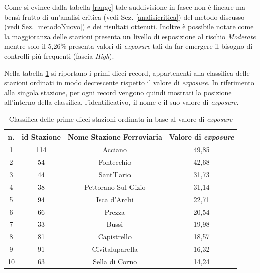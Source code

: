 Come si evince dalla tabella \ref{range} tale suddivisione in fasce non è lineare ma bensì frutto di un'analisi critica (vedi Sez.  \ref{analisicritica}) del metodo discusso (vedi Sez. \ref{metodoNuovo}) e dei risultati ottenuti. Inoltre è possibile notare come la maggioranza delle stazioni presenta un livello di esposizione al rischio \textit{Moderate} mentre solo il 5,26\% presenta valori di \textit{exposure} tali da far emergere il bisogno di controlli più frequenti (fascia \textit{High}).

Nella tabella \ref{classifica} si riportano i primi dieci record, appartenenti alla classifica delle stazioni ordinati in modo decrescente rispetto il valore di \textit{exposure}. In riferimento alla singola stazione, per ogni record vengono quindi mostrati la posizione all'interno della classifica, l'identificativo, il nome e il suo valore di \textit{exposure}.

\begin{table}[h]
\centering
\begin{tabular}{|c|c|c|c|}
\hline
\rowcolor{lightgray}
\textbf{n.} & \textbf{id Stazione} & \textbf{Nome Stazione Ferroviaria} & \textbf{Valore di \textit{exposure}} \\
\hline
\rowcolor{flamingopink}
1 & 114 & Acciano & 49,85 \\
\hline
\rowcolor{flamingopink}
2 & 54 & Fontecchio & 42,68 \\
\hline
\rowcolor{flamingopink}
3 & 44 & Sant'Ilario & 31,73 \\
\hline
\rowcolor{flamingopink}
4 & 38 & Pettorano Sul Gizio & 31,14 \\
\hline
\rowcolor{flamingopink}
5 & 94 & Isca d'Archi & 22,71 \\
\hline
\rowcolor{flamingopink}
6 & 66 & Prezza & 20,54 \\
\hline
\rowcolor{icterine}
7 & 33 & Bussi & 19,98 \\
\hline
\rowcolor{icterine}
8 & 81 & Capistrello & 18,57 \\
\hline
\rowcolor{icterine}
9 & 91 & Civitaluparella & 16,32 \\
\hline
\rowcolor{icterine}
10 & 63 & Sella di Corno & 14,24 \\
\hline
\end{tabular}
\caption{Classifica delle prime dieci stazioni ordinata in base al valore di \textit{exposure}}
\label{classifica}
\end{table}
